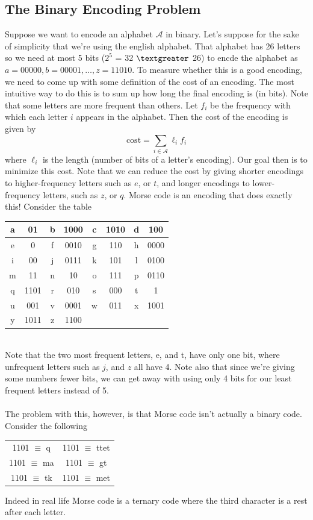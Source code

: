 \documentclass{article}
\newcommand{\gt}{\textgreater}
\newcommand{\mcal}[1]{\mathcal{#1}}
\begin{document}
\subsection{The Binary Encoding Problem}
Suppose we want to encode an alphabet $\mcal{A}$ in binary. Let's suppose for the sake of simplicity that we're using the english alphabet. That alphabet has 26 letters so we need at most 5 bits ($2^5$ = 32 $\gt$ 26) to encde the alphabet as $a = 00000, b = 00001, \dots, z = 11010$. To measure whether this is a good encoding, we need to come up with some definition of the cost of an encoding. The most intuitive way to do this is to sum up how long the final encoding is (in bits). Note that some letters are more frequent than others. Let $f_i$ be the frequency with which each letter $i$ appears in the alphabet. Then the cost of the encoding is given by
\[\text{cost} = \sum_{i \in \mcal{A}} \ell_{i}f_{i}\]
where $\ell_i$ is the length (number of bits of a letter's encoding). Our goal then is to minimize this cost. Note that we can reduce the cost by giving shorter encodings to higher-frequency letters such as $e$, or $t$, and longer encodings to lower-frequency letters, such as $z$, or $q$. Morse code is an encoding that does exactly this! Consider the table
\begin{center}
\begin{tabular}{| c c | c c | c c | c c |}
\hline
a & 01 & b & 1000 & c & 1010 & d & 100\\
\hline
e & 0 & f & 0010 & g & 110 & h & 0000 \\
\hline
i & 00 & j & 0111 & k & 101 & l & 0100\\
\hline
m & 11 & n & 10 & o & 111 & p & 0110 \\
\hline
q & 1101 & r & 010 & s & 000 & t & 1\\
\hline
u & 001 & v & 0001 & w & 011 & x & 1001 \\
\hline
y & 1011 & z & 1100 &&&&\\
\hline
\end{tabular}
\end{center}
\ \\
Note that the two most frequent letters, e, and t, have only one bit, where unfrequent letters such as $j$, and $z$ all have 4. Note also that since we're giving some numbers fewer bits, we can get away with using only 4 bits for our least frequent letters instead of 5.\\\\
The problem with this, however, is that Morse code isn't actually a binary code. Consider the following
\begin{center}
\begin{tabular}{ c c }
1101 $\equiv$ q & 1101 $\equiv$ ttet\\
1101 $\equiv$ ma & 1101 $\equiv$ gt\\
1101 $\equiv$ tk & 1101 $\equiv$ met\\
\end{tabular}
\end{center}
Indeed in real life Morse code is a ternary code where the third character is a rest after each letter.
\end{document}
